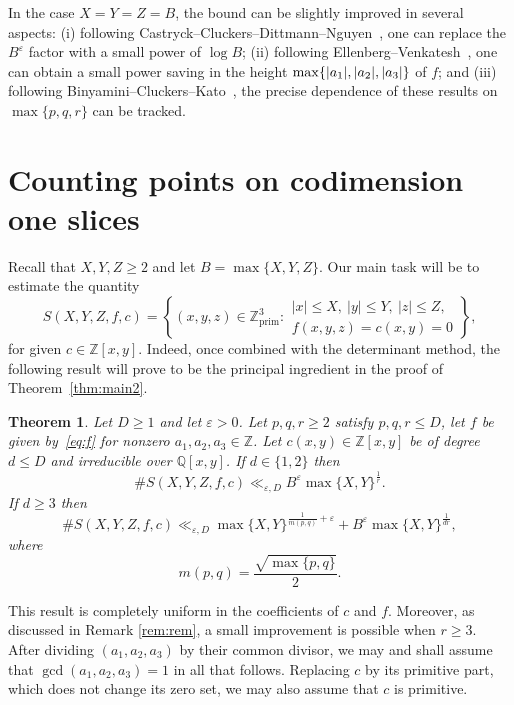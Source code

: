 \documentclass[a4paper,11pt,twoside,reqno]{amsart}
\newtheorem{theorem}{Theorem}[section]
\theoremstyle{definition}
\theoremstyle{remark}
\numberwithin{equation}{section}
\newcommand\eps{\varepsilon}
\newcommand\ve{\varepsilon}
\newcommand\Z{\mathbb{Z}}
\newcommand\ZZ{\mathbb{Z}}
\newcommand\ZZp{\mathbb{Z}_{\text{prim}}}
\newcommand\Q{\mathbb{Q}}
\newcommand\1{\mathbf{1}}
\renewcommand{\leq}{\leqslant}
\renewcommand{\geq}{\geqslant}
\DeclarePairedDelimiter\abs{\lvert}{\rvert}
\begin{document}
In the case $X=Y=Z=B$, the bound can be slightly improved in several aspects: (i) following Castryck--Cluckers--Dittmann--Nguyen~\cite{nolog}, one can replace the $B^{\ve}$ factor with a small power of $\log B$;
(ii)
 following Ellenberg--Venkatesh~\cite{ellenberg}, one can obtain a small power 
 saving in the height 
 $\max\{\abs{a_1},\abs{a_2},\abs{a_3}\}$
 of $f$; and (iii) 
 following Binyamini--Cluckers--Kato~\cite{quadratic}, the precise dependence of these results
 on $\max\{p,q,r\}$ can be tracked.
 
\section{Counting points on codimension one slices}

Recall that $X,Y,Z\geq 2$ and let $B=\max\{X,Y,Z\}$. 
Our main task will be to estimate the quantity
\begin{equation}\label{eq:duck}
S(X,Y,Z,f,c)
 =
 \left\{
 (x,y,z)\in\ZZp^3:
 \begin{array}{l}
|x|\leq X,~ |y|\leq Y,~ |z|\leq Z,\\
 f(x,y,z)=c(x,y)=0
 \end{array}
 \right\},
\end{equation}
for given $c\in \Z[x,y]$. Indeed, once
combined with the determinant method, 
the following result will prove to be the principal ingredient in the proof of Theorem~\ref{thm:main2}.

\begin{theorem}\label{thm:main}
Let $D\geq 1$ and let $\eps>0$. Let $p,q,r\geq 2$ satisfy $p,q,r\leq D$, let 
$f$ be given by~\eqref{eq:f} for nonzero $a_1,a_2,a_3\in \ZZ$. 
Let $c(x,y)\in\Z[x,y]$ be of degree $d\leq D$ and irreducible over $\Q[x,y]$.
If $d\in \{1,2\}$ then
\begin{equation}\label{eq:main-bound2}
\#S(X,Y,Z,f,c)\ll_{\ve,D} B^{\ve}\max\{X,Y\}^{\frac{1}{r}}.
\end{equation}
If $d\geq 3$ then 
\begin{equation}\label{eq:main-bound}
\#S(X,Y,Z,f,c)\ll_{\ve,D} \max\{X,Y\}^{\frac{1}{m(p,q)}+\ve}+B^{\ve}\max\{X,Y\}^{\frac{1}{dr}},
\end{equation}
where
\begin{equation}\label{eq:mpq}
m(p,q)=\frac{\sqrt{\max\{p,q\}}}{2}.
\end{equation}
\end{theorem}

This result is completely uniform in the coefficients of $c$ and $f$.
Moreover, as discussed in Remark \ref{rem:rem}, a small improvement is possible when $r\geq 3$.
After dividing $(a_1,a_2,a_3)$ by their common divisor, we may and shall assume that $\gcd(a_1,a_2,a_3)=1$ in all that follows. 
Replacing $c$ by its primitive part, which does not change its
zero set, we may also assume that $c$ is primitive.
\end{document}
